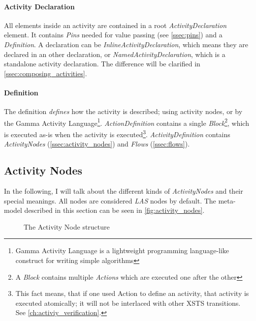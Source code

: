 \paragraph{Activity Declaration}\label{par:activity_declaration}

All elements inside an activity are contained in a root \emph{ActivityDeclaration} element. It contains \emph{Pins} needed for value passing (see \autoref{ssec:pins}) and a \emph{Definition}. A declaration can be \emph{InlineActivityDeclaration}, which means they are declared in an other declaration, or \emph{NamedActivityDeclaration}, which is a standalone activity declaration. The difference will be clarified in \autoref{ssec:composing_activities}.

\paragraph{Definition}\label{par:definition}

The definition \emph{defines} how the activity is described; using activity nodes, or by the Gamma Activity Language\footnote{Gamma Activity Language is a lightweight programming language-like construct for writing simple algorithms}. \emph{ActionDefinition} contains a single \emph{Block}\footnote{A \emph{Block} contains multiple \emph{Actions} which are executed one after the other}, which is executed as-is when the activity is executed\footnote{This fact means, that if one used Action to define an activity, that activity is executed atomically; it will not be interlaced with other XSTS transitions. See \autoref{ch:activiy_verification}.}. \emph{ActivityDefinition} contains \emph{ActivityNodes} (\autoref{ssec:activity_nodes}) and \emph{Flows} (\autoref{ssec:flows}).

\subsection{Activity Nodes}\label{ssec:activity_nodes}

In the following, I will talk about the different kinds of \emph{ActivityNodes} and their special meanings. All nodes are considered \emph{LAS} nodes by default. The meta-model described in this section can be seen in \autoref{fig:activity_nodes}.

\begin{figure}[!ht]
	\centering
	
	\caption{The Activity Node structure}
	\label{fig:activity_nodes}
\end{figure}


